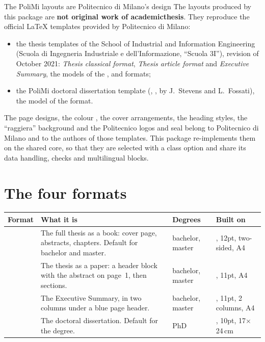 \documentclass[11pt,a4paper,oneside]{report}
\begin{document}
\begin{notebox}{The PoliMi layouts are Politecnico di Milano's design}
The layouts produced by this package are \textbf{not original work of
academicthesis}. They reproduce the official \LaTeX{} templates provided by
Politecnico di Milano:
\begin{itemize}
  \item the thesis templates of the School of Industrial and Information
    Engineering (Scuola di Ingegneria Industriale e dell'Informazione,
    ``Scuola 3I''), revision of October 2021: \emph{Thesis classical
    format}, \emph{Thesis article format} and \emph{Executive Summary},
    the models of the ,  and 
    formats;
  \item the PoliMi doctoral dissertation template (,
    , by J.~Stevens and L.~Fossati), the model of the
     format.
\end{itemize}
The page designs, the colour , the cover arrangements, the
heading styles, the ``raggiera'' background and the Politecnico logos and
seal belong to Politecnico di Milano and to the authors of those
templates. This package re-implements them on the shared
 core, so that they are selected with a class option
and share its data handling, checks and multilingual blocks.
\end{notebox}

\section{The four formats}

\begin{center}
  \hfill
  \hfill
  \hfill
\end{center}

\begin{tabularx}{\textwidth}{@{}l Y l l@{}}
\toprule
\textbf{Format} & \textbf{What it is} & \textbf{Degrees} & \textbf{Built on} \\
\midrule
{} & The full thesis as a book: cover page, abstracts, chapters. Default for bachelor and master. & bachelor, master & , 12pt, two-sided, A4 \\
 & The thesis as a paper: a header block with the abstract on page~1, then sections. & bachelor, master & , 11pt, A4 \\
 & The Executive Summary, in two columns under a blue page header. & bachelor, master & , 11pt, 2 columns, A4 \\
 & The doctoral dissertation. Default for the  degree. & PhD & , 10pt, 17$\times$24\,cm \\
\bottomrule
\end{tabularx}
\end{document}
